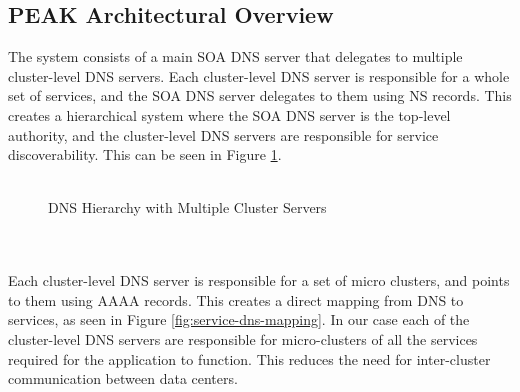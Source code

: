 \documentclass[12pt]{article}
\begin{document}
\subsection{PEAK Architectural Overview}
The system consists of a main SOA DNS server that delegates to multiple cluster-level DNS servers.
Each cluster-level DNS server is responsible for a whole set of services, and the SOA DNS server delegates to them using NS records.
This creates a hierarchical system where the SOA DNS server is the top-level authority, and the cluster-level DNS servers are responsible for service discoverability.
This can be seen in Figure \ref{fig:dns-hierarchy}.
\\
\\
\begin{figure}[h]
    \centering
    \caption{DNS Hierarchy with Multiple Cluster Servers}
    \label{fig:dns-hierarchy}
\end{figure}
\\
\\
Each cluster-level DNS server is responsible for a set of micro clusters, and points to them using AAAA records.
This creates a direct mapping from DNS to services, as seen in Figure \ref{fig:service-dns-mapping}.
In our case each of the cluster-level DNS servers are responsible for micro-clusters of all the services required 
for the application to function. This reduces the need for inter-cluster communication between data centers.
\end{document}
